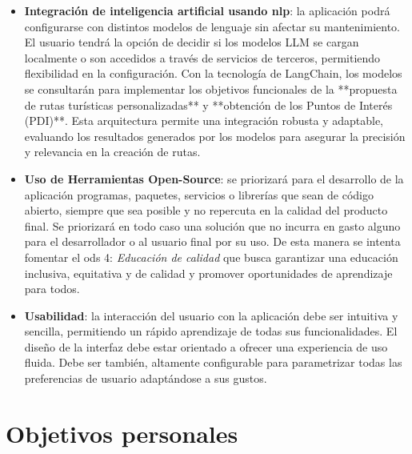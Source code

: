 \begin{itemize}
	\item \textbf{Integración de inteligencia artificial usando \acrfull{nlp}}: la aplicación podrá configurarse con distintos modelos de lenguaje sin afectar su mantenimiento. El usuario  tendrá la opción de decidir si los modelos LLM se cargan localmente o son accedidos a través de servicios de terceros, permitiendo flexibilidad en la configuración. Con la tecnología de LangChain, los modelos se consultarán para implementar los objetivos funcionales de la **propuesta de rutas turísticas personalizadas** y **obtención de los Puntos de Interés (PDI)**. Esta arquitectura permite una integración robusta y adaptable, evaluando los resultados generados por los modelos para asegurar la precisión y relevancia en la creación de rutas.
    \item \textbf{Uso de Herramientas Open-Source}: se priorizará para el desarrollo de la aplicación programas, paquetes, servicios o librerías que sean de código abierto, siempre que sea posible y no repercuta en la calidad del producto final. Se priorizará en todo caso una solución que no incurra en gasto alguno para el desarrollador o al usuario final por su uso. De esta manera se intenta fomentar el \acrshort{ods} 4: \textit{Educación de calidad} que busca garantizar una educación inclusiva, equitativa y de calidad y promover oportunidades de aprendizaje para todos.
    \item \textbf{Usabilidad}: la interacción del usuario con la aplicación debe ser intuitiva y sencilla, permitiendo un rápido aprendizaje de todas sus funcionalidades. El diseño de la interfaz debe estar orientado a ofrecer una experiencia de uso fluida. Debe ser también, altamente configurable para parametrizar todas las preferencias de usuario adaptándose a sus gustos.
\end{itemize}

\section{Objetivos personales}


